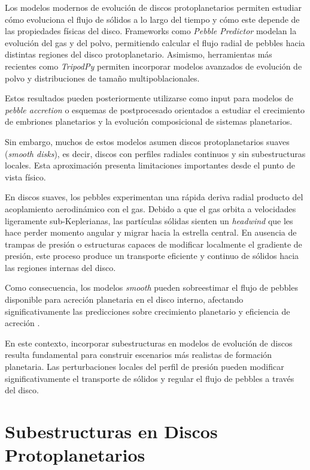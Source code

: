 Los modelos modernos de evolución de discos protoplanetarios permiten estudiar cómo evoluciona el flujo de sólidos a lo largo del tiempo y cómo este depende de las propiedades físicas del disco. Frameworks como \textit{Pebble Predictor} \citep{Drazkowska2021} modelan la evolución del gas y del polvo, permitiendo calcular el flujo radial de pebbles hacia distintas regiones del disco protoplanetario. Asimismo, herramientas más recientes como \textit{TripodPy} \citep{Pfeil2024_teoria, Pfeil2025_codigo} permiten incorporar modelos avanzados de evolución de polvo y distribuciones de tamaño multipoblacionales.

Estos resultados pueden posteriormente utilizarse como input para modelos de \textit{pebble accretion} o esquemas de postprocesado orientados a estudiar el crecimiento de embriones planetarios y la evolución composicional de sistemas planetarios.

Sin embargo, muchos de estos modelos asumen discos protoplanetarios suaves (\textit{smooth disks}), es decir, discos con perfiles radiales continuos y sin subestructuras locales. Esta aproximación presenta limitaciones importantes desde el punto de vista físico.

En discos suaves, los pebbles experimentan una rápida deriva radial producto del acoplamiento aerodinámico con el gas. Debido a que el gas orbita a velocidades ligeramente sub-Keplerianas, las partículas sólidas sienten un \textit{headwind} que les hace perder momento angular y migrar hacia la estrella central. En ausencia de trampas de presión o estructuras capaces de modificar localmente el gradiente de presión, este proceso produce un transporte eficiente y continuo de sólidos hacia las regiones internas del disco.

Como consecuencia, los modelos \textit{smooth} pueden sobreestimar el flujo de pebbles disponible para acreción planetaria en el disco interno, afectando significativamente las predicciones sobre crecimiento planetario y eficiencia de acreción \citep{Lau2024, Appelgren2020, Appelgren2025}.

En este contexto, incorporar subestructuras en modelos de evolución de discos resulta fundamental para construir escenarios más realistas de formación planetaria. Las perturbaciones locales del perfil de presión pueden modificar significativamente el transporte de sólidos y regular el flujo de pebbles a través del disco.


\section{Subestructuras en Discos Protoplanetarios}

